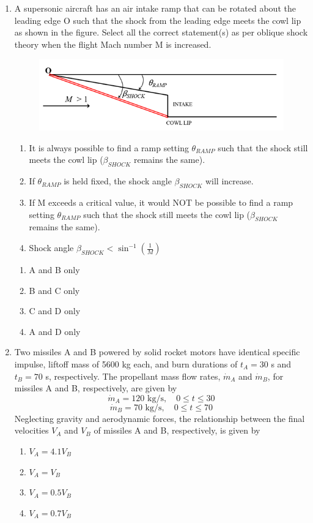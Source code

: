 \documentclass{article}
\begin{document}
\begin{enumerate}[leftmargin=*, resume]
\item A supersonic aircraft has an air intake ramp that can be rotated about the leading edge O such that the shock from the leading edge meets the cowl lip as shown in the figure. Select all the correct statement(s) as per oblique shock theory when the flight Mach number M is increased.
\begin{figure}[H]
    \centering
    \includegraphics[width=0.3\linewidth]{figs/q37.png}
    \caption{}
    \label{fig:q37}
\end{figure}
\begin{enumerate}
\item It is always possible to find a ramp setting $\theta_{RAMP}$ such that the shock still meets the cowl lip ($\beta_{SHOCK}$ remains the same).
\item If $\theta_{RAMP}$ is held fixed, the shock angle $\beta_{SHOCK}$ will increase.
\item If M exceeds a critical value, it would NOT be possible to find a ramp setting $\theta_{RAMP}$ such that the shock still meets the cowl lip ($\beta_{SHOCK}$ remains the same).
\item Shock angle $\beta_{SHOCK} < \sin^{-1}\left(\frac{1}{M}\right)$
\end{enumerate}
\begin{multicols}{4}
\begin{enumerate}
\item A and B only
\item B and C only
\item C and D only
\item A and D only
\end{enumerate}
\end{multicols}

\item Two missiles A and B powered by solid rocket motors have identical specific impulse, liftoff mass of 5600 kg each, and burn durations of $t_A = 30$ s and $t_B = 70$ s, respectively. The propellant mass flow rates, $\dot{m}_A$ and $\dot{m}_B$, for missiles A and B, respectively, are given by
\[
\dot{m}_A = 120 \text{ kg/s}, \quad 0 \leq t \leq 30
\]
\[
\dot{m}_B = 70 \text{ kg/s}, \quad 0 \leq t \leq 70
\]
Neglecting gravity and aerodynamic forces, the relationship between the final velocities $V_A$ and $V_B$ of missiles A and B, respectively, is given by
\begin{multicols}{4}
\begin{enumerate}
\item $V_A = 4.1 V_B$
\item $V_A = V_B$
\item $V_A = 0.5 V_B$
\item $V_A = 0.7 V_B$
\end{enumerate}
\end{multicols}


\end{enumerate}
\end{document}
